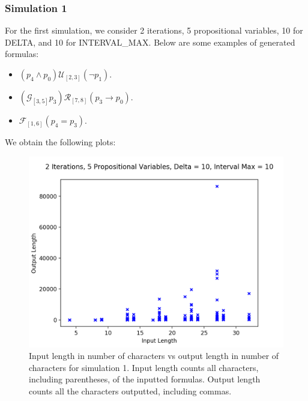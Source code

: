 \documentclass[runningheads]{llncs}
\begin{document}
\subsubsection{Simulation 1}
For the first simulation, we consider 2 iterations, 5 propositional variables, 10 for DELTA, and 10 for INTERVAL\_MAX. Below are some examples of generated formulas:
\begin{itemize}
  \item $(p_4 \land p_0) \mathcal{U}_{[2,3]} (\neg p_1)$.
  \item $(\mathcal{G}_{[3,5]} p_3) \mathcal{R}_{[7,8]} (p_3 \rightarrow p_0)$.
  \item $\mathcal{F}_{[1,6]} (p_4 = p_3)$.
\end{itemize}
We obtain the following plots:
\begin{figure}[H]
    \centering
    \includegraphics[scale=0.75]{images/Sim1Length.png}
    \caption{Input length in number of characters vs output length in number of characters for simulation 1. Input length counts all characters, including parentheses, of the inputted formulas. Output length counts all the characters outputted, including commas.}
\end{figure}
\end{document}
